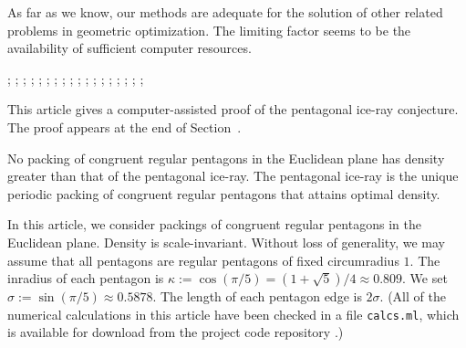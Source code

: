 As far as we know, our methods are adequate for the solution of other
related problems in geometric optimization.  The limiting factor seems
to be the availability of sufficient computer resources.

{
;  %
;  %
;  
;  %
; 
;  
;  
;  %
; 
;  
;  
;  %
;  %
; 
;  %
; 
;  
;   
}



This article gives a computer-assisted proof of the pentagonal ice-ray
conjecture.  The proof appears at the end of Section~.


\begin{theorem}  
  No packing of congruent regular pentagons in the Euclidean plane has
  density greater than that of the pentagonal ice-ray.  The pentagonal
  ice-ray is the unique periodic packing of congruent regular
  pentagons that attains optimal density.
\end{theorem}

In this article, we consider packings of congruent regular pentagons
in the Euclidean plane.  Density is scale-invariant.  Without loss of
generality, we may assume that all pentagons are regular pentagons of
fixed circumradius $1$.  The inradius of each pentagon is $\kappa:=
\cos (\pi/5) = (1+\sqrt{5})/4 \approx 0.809$. We set $\sigma :=
\sin(\pi/5) \approx 0.5878$.  The length of each pentagon edge is
$2\sigma$.  (All of the numerical calculations in this article have
been checked in a file {\tt calcs.ml}, which is available for download
from the project code repository \cite{Git}.)

